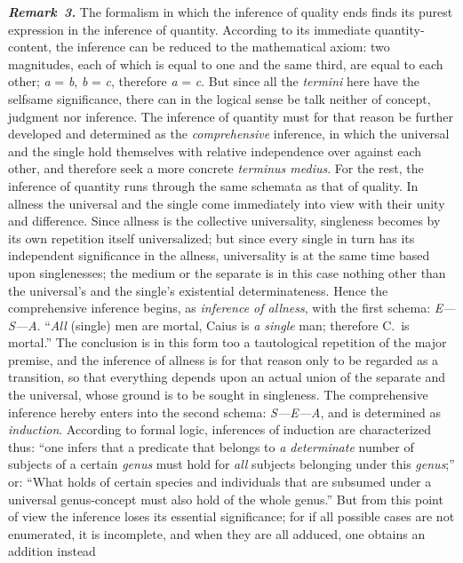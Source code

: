 \documentclass[12pt]{book}
\newcommand{\anm}[1]{\emph{\textbf{Remark~#1.}}}
\begin{document}
\anm{3} The formalism in which the inference of quality ends finds its
purest expression in the inference of quantity. According to its immediate
quantity-content, the inference can be reduced to the mathematical axiom:
two magnitudes, each of which is equal to one and the same third, are equal
to each other; \textit{a} = \textit{b}, \textit{b} = \textit{c}, therefore
\textit{a} = \textit{c}. But since all the \textit{termini} here have the
selfsame significance, there can in the logical sense be talk neither of
concept, judgment nor inference. The inference of quantity must for that
reason be further developed and determined as the \emph{comprehensive}
inference, in which the universal and the single hold themselves with
relative independence over against each other, and therefore seek a more
concrete \textit{terminus medius}. For the rest, the inference of quantity
runs through the same schemata as that of quality. In allness the universal
and the single come immediately into view with their unity and difference.
Since allness is the collective universality, singleness becomes by its own
repetition itself universalized; but since every single in turn has its
independent significance in the allness, universality is at the same time
based upon singlenesses; the medium or the separate is in this case nothing
other than the universal's and the single's existential determinateness.
Hence the comprehensive inference begins, as \emph{inference of allness},
with the first schema: \textit{E---S---A}. ``\emph{All} (single) men are
mortal, Caius is \emph{a single} man; therefore C.\ is mortal.'' The
conclusion is in this form too a tautological repetition of the major
premise, and the inference of allness is for that reason only to be regarded
as a transition, so that everything depends upon an actual union of the
separate and the universal, whose ground is to be sought in singleness. The
comprehensive inference hereby enters into the second schema:
\textit{S---E---A}, and is determined as \emph{induction}. According to
formal logic, inferences of induction are characterized thus: ``one infers
that a predicate that belongs to \emph{a determinate} number of subjects of
a certain \textit{genus} must hold for \emph{all} subjects belonging under
this \textit{genus};'' or: ``What holds of certain species and individuals
that are subsumed under a universal genus-concept must also hold of the
whole genus.'' But from this point of view the inference loses its essential
significance; for if all possible cases are not enumerated, it is
incomplete, and when they are all adduced, one obtains an addition instead
\end{document}
